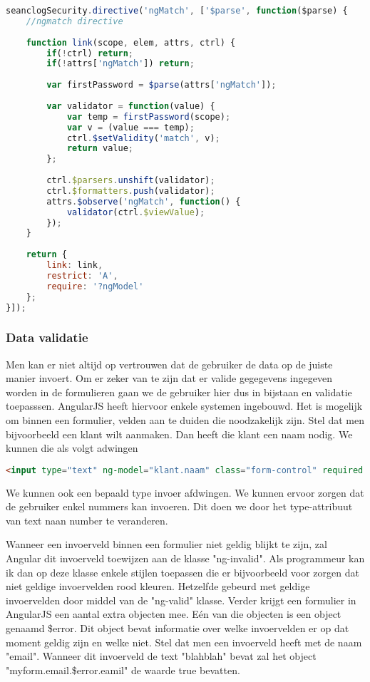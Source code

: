 \documentclass[a4paper,11pt]{article}
\begin{document}
\begin{lstlisting}[language=javascript]
seanclogSecurity.directive('ngMatch', ['$parse', function($parse) {
	//ngmatch directive
	
	function link(scope, elem, attrs, ctrl) {
		if(!ctrl) return;
		if(!attrs['ngMatch']) return;
		
		var firstPassword = $parse(attrs['ngMatch']);
		
		var validator = function(value) {
			var temp = firstPassword(scope);
			var v = (value === temp);
			ctrl.$setValidity('match', v);
			return value;
		};
		
		ctrl.$parsers.unshift(validator);
		ctrl.$formatters.push(validator);
		attrs.$observe('ngMatch', function() {
			validator(ctrl.$viewValue);
		});
	}
	
	return {
		link: link,
		restrict: 'A',
		require: '?ngModel'
	};
}]);
\end{lstlisting}

\subsubsection{Data validatie}
Men kan er niet altijd op vertrouwen dat de gebruiker de data op de juiste manier invoert. Om er zeker van te zijn dat er valide gegegevens ingegeven worden in de formulieren gaan we de gebruiker hier dus in bijstaan en validatie toepasssen. AngularJS heeft hiervoor enkele systemen ingebouwd. Het is mogelijk om binnen een formulier, velden aan te duiden die noodzakelijk zijn. Stel dat men bijvoorbeeld een klant wilt aanmaken. Dan heeft die klant een naam nodig. We kunnen die als volgt adwingen
\begin{lstlisting}[language=html]
<input type="text" ng-model="klant.naam" class="form-control" required />
\end{lstlisting}

We kunnen ook een bepaald type invoer afdwingen. We kunnen ervoor zorgen dat de gebruiker enkel nummers kan invoeren. Dit doen we door het type-attribuut van text naan number te veranderen.

Wanneer een invoerveld binnen een formulier niet geldig blijkt te zijn, zal Angular dit invoerveld toewijzen aan de klasse "ng-invalid". Als programmeur kan ik dan op deze klasse enkele stijlen toepassen die er bijvoorbeeld voor zorgen dat niet geldige invoervelden rood kleuren. Hetzelfde gebeurd met geldige invoervelden door middel van de "ng-valid" klasse. Verder krijgt een formulier in AngularJS een aantal extra objecten mee. Eén van die objecten is een object genaamd \$error. Dit object bevat informatie over welke invoervelden er op dat moment geldig zijn en welke niet. Stel dat men een invoerveld heeft met de naam "email". Wanneer dit invoerveld de text "blahblah" bevat zal het object "myform.email.\$error.eamil" de waarde true bevatten.
\end{document}
